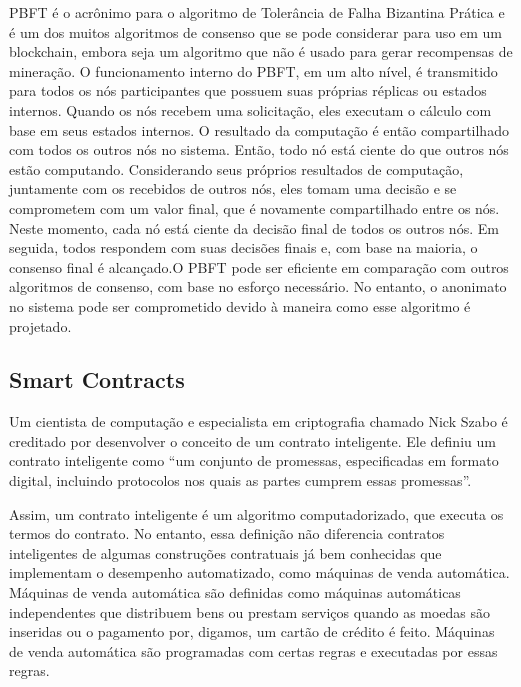            PBFT é o acrônimo para o algoritmo de Tolerância de Falha Bizantina Prática e é um dos muitos algoritmos de consenso que se pode considerar para uso em um blockchain, embora seja um algoritmo que não é usado para gerar recompensas de mineração. O funcionamento interno do PBFT, em um alto nível, é transmitido para todos os nós participantes que possuem suas próprias réplicas ou estados internos. Quando os nós recebem uma solicitação, eles executam o cálculo com base em seus estados internos. O resultado da computação é então compartilhado com todos os outros nós no sistema. Então, todo nó está ciente do que outros nós estão computando. Considerando seus próprios resultados de computação, juntamente com os recebidos de outros nós, eles tomam uma decisão e se comprometem com um valor final, que é novamente compartilhado entre os nós. Neste momento, cada nó está ciente da decisão final de todos os outros nós. Em seguida, todos respondem com suas decisões finais e, com base na maioria, o consenso final é alcançado.O PBFT pode ser eficiente em comparação com outros algoritmos de consenso, com base no esforço necessário. No entanto, o anonimato no sistema pode ser comprometido devido à maneira como esse algoritmo é projetado. \cite{beginnig_blockchain_bikramaditya}

    
    \subsection{Smart Contracts}
        
        Um cientista de computação e especialista em criptografia chamado Nick Szabo é creditado por desenvolver o conceito de um contrato inteligente. Ele definiu um contrato inteligente como ``um conjunto de promessas, especificadas em formato digital, incluindo protocolos nos quais as partes cumprem essas promessas''. \cite{smart_contracts_szabo}

        Assim, um contrato inteligente é um algoritmo computadorizado, que executa os termos do contrato. No entanto, essa definição não diferencia contratos inteligentes de algumas construções contratuais já bem conhecidas que implementam o desempenho automatizado, como máquinas de venda automática. Máquinas de venda automática são definidas como máquinas automáticas independentes que distribuem bens ou prestam serviços quando as moedas são inseridas ou o pagamento por, digamos, um cartão de crédito é feito. Máquinas de venda automática são programadas com certas regras e executadas por essas regras. \cite{blockchain_pratical_guide}
        
